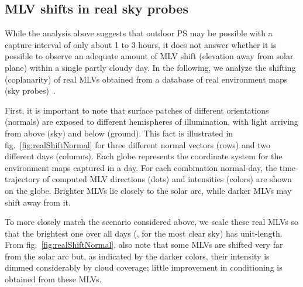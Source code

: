 \subsection{MLV shifts in real sky probes}



While the analysis above suggests that outdoor PS may be possible with a capture interval of only about 1 to 3 hours, it does not answer whether it is possible to observe an adequate amount of MLV shift (elevation away from solar plane) within a single partly cloudy day. In the following, we analyze the shifting (coplanarity) of real MLVs obtained from a database of real environment maps (sky probes)~\cite{holdgeoffroy-iccp-15}.


First, it is important to note that surface patches of different orientations (normals) are exposed to different hemispheres of illumination, with light arriving from above (sky) and below (ground). This fact is illustrated in fig.~\ref{fig:realShiftNormal} for three different normal vectors (rows) and two different days (columns). Each globe represents the coordinate system for the environment maps captured in a day. For each combination normal-day, the time-trajectory of computed MLV directions (dots) and intensities (colors) are shown on the globe. Brighter MLVs lie closely to the solar arc, while darker MLVs may shift away from it. 

To more closely match the scenario considered above, we scale these real MLVs so that the brightest one over all days (\ie, for the most clear sky) has unit-length. From fig.~\ref{fig:realShiftNormal}, also note that some MLVs are shifted very far from the solar arc but, as indicated by the darker colors, their intensity is dimmed considerably by cloud coverage; little improvement in conditioning is obtained from these MLVs.

